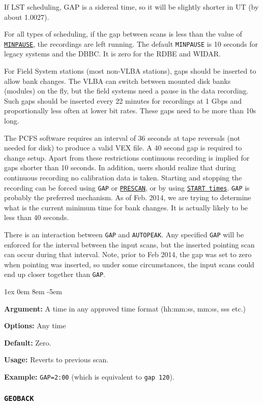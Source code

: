 \documentclass{report}
\newcommand{\rcwbox}[5]{
  \begin{list}{}{\parsep 1ex  \itemsep 0em
                 \leftmargin 8em  \itemindent -5em }
    \item {\bf Argument:} #1
    \item {\bf Options:}  #2
    \item {\bf Default:}  #3
    \item {\bf Usage:}    #4
    \item {\bf Example:}  #5
  \end{list}
}
\begin{document}
If LST scheduling, GAP is a sidereal time, so it will be slightly
shorter in UT (by about 1.0027).

For all types of scheduling, if the gap between scans is less than the
value of 
{\hyperref[MP:MINPAUSE]{{\tt MINPAUSE}}}, the recordings are
left running.  The default {\tt MINPAUSE} is 10 seconds for legacy
systems and the DBBC. It is zero for the RDBE and WIDAR.

For Field System stations (most non-VLBA stations), gaps should be inserted to
allow bank changes.  The VLBA can switch between mounted disk banks
(modules) on the fly, but the field systems need a pause in the data
recording.  Such gaps should be inserted every 22 minutes for
recordings at 1 Gbps and proportionally less often at lower bit rates.
These gaps need to be more than 10s long.

The PCFS software requires an interval of 36 seconds at tape reversals
(not needed for disk) to produce a valid VEX file. A 40 second gap is
required to change setup.  Apart from these restrictions continuous
recording is implied for gaps shorter than 10 seconds.  In addition,
users should realize that during continuous recording no calibration
data is taken. Starting and stopping the recording can be forced using
{\tt GAP} or 
{\hyperref[MP:PRESCAN]{{\tt PRESCAN}}}, or by using
{\hyperref[MP:START]{{\tt START times}}}.  {\tt GAP} is probably the
preferred mechanism.  As of Feb. 2014, we are trying to determine what
is the current minimum time for bank changes.  It is actually likely
to be less than 40 seconds.

There is an interaction between {\tt GAP} and {\tt AUTOPEAK}.  Any 
specified {\tt GAP} will be enforced for the interval between the 
input scans, but the inserted pointing scan can occur during that 
interval.  Note, prior to Feb 2014, the gap was set to zero when
pointing was inserted, so under some circumstances, the input scans
could end up closer together than {\tt GAP}.


\rcwbox
{A time in any approved time format (hh:mm:ss, mm:ss, sss etc.)}
{Any time}
{Zero.}
{Reverts to previous scan.}
{{\tt GAP=2:00} (which is equivalent to {\tt gap 120}).}


\subsubsection{\label{MP:GEOBACK}{\tt GEOBACK}}
\end{document}
